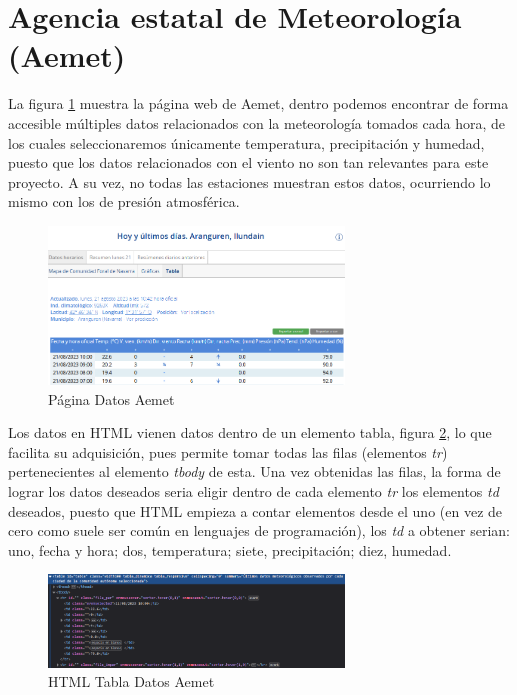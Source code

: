 \section{Agencia estatal de Meteorología (Aemet)}
La figura \ref{fig:ej3} muestra la página web de Aemet, dentro podemos encontrar de forma accesible múltiples datos relacionados con la meteorología tomados cada hora, de los cuales seleccionaremos únicamente temperatura, precipitación y humedad, puesto que los datos relacionados con el viento no son tan relevantes para este proyecto. A su vez, no todas las estaciones muestran estos datos, ocurriendo lo mismo con los de presión atmosférica.

\begin{figure} [H]
	\centering
	\includegraphics[width=0.7\textwidth]{fig/AemetData.png}
	\caption[Página Aemet de la estación en Aranguren (Navarra)]{Página Datos Aemet}
	\label{fig:ej3}
\end{figure}

Los datos en HTML vienen datos dentro de un elemento tabla, figura \ref{fig:ej20}, lo que facilita su adquisición, pues permite tomar todas las filas (elementos \textit{tr}) pertenecientes al elemento \textit{tbody} de esta. Una vez obtenidas las filas, la forma de lograr los datos deseados seria eligir dentro de cada elemento \textit{tr} los elementos \textit{td} deseados, puesto que HTML empieza a contar elementos desde el uno (en vez de cero como suele ser común en lenguajes de programación), los \textit{td} a obtener serian: uno, fecha y hora; dos, temperatura; siete, precipitación; diez, humedad.

\begin{figure} [H]
	\centering
	\includegraphics[width=0.7\textwidth]{fig/AemetDataHTML.png}
	\caption[HTML de la tabla de datos de Aemet de la estación en Aranguren (Navarra)]{HTML Tabla Datos Aemet}
	\label{fig:ej20}
\end{figure}

